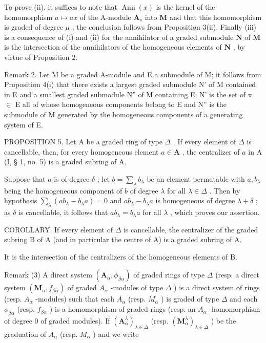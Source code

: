 To prove (ii), it suffices to note that \(\operatorname{Ann}(x)\) is the kernel of the homomorphism \(a \mapsto ax\) of the A-module \(\mathbf{A}_s\) into \(\mathbf{M}\) and that this homomorphism is graded of degree \(\mu\) ; the conclusion follows from Proposition 3(ii). Finally (iii) is a consequence of (i) and (ii) for the annihilator of a graded submodule \(\mathbf{N}\) of \(\mathbf{M}\) is the intersection of the annihilators of the homogeneous elements of \(\mathbf{N}\) , by virtue of Proposition 2.

Remark 2. Let M be a graded A-module and E a submodule of M; it follows from Proposition 4(i) that there exists a largest graded submodule N' of M contained in E and a smallest graded submodule N'' of M containing E; N' is the set of x \ensuremath{\in} E all of whose homogeneous components belong to E and N'' is the submodule of M generated by the homogeneous components of a generating system of E.

PROPOSITION 5. Let A be a graded ring of type \(\Delta\) . If every element of \(\Delta\) is cancellable, then, for every homogeneous element \(a \in \mathbf{A}\) , the centralizer of \(a\) in A (I, § 1, no. 5) is a graded subring of A.

Suppose that \(a\) is of degree \(\delta\) ; let \(b = \sum_{\lambda} b_{\lambda}\) be an element permutable with \(a, b_{\lambda}\) being the homogeneous component of \(b\) of degree \(\lambda\) for all \(\lambda \in \Delta\) . Then by hypothesis \(\sum_{\lambda} (ab_{\lambda} - b_{\lambda}a) = 0\) and \(ab_{\lambda} - b_{\lambda}a\) is homogeneous of degree \(\lambda + \delta\) ; as \(\delta\) is cancellable, it follows that \(ab_{\lambda} = b_{\lambda}a\) for all \(\lambda\) , which proves our assertion.

COROLLARY. If every element of \(\Delta\) is cancellable, the centralizer of the graded subring B of A (and in particular the centre of A) is a graded subring of A.

It is the intersection of the centralizers of the homogeneous elements of B.

Remark (3) A direct system \((\mathbf{A}_{\alpha}, \phi_{\beta\alpha})\) of graded rings of type \(\Delta\) (resp. a direct system \((\mathbf{M}_{\alpha}, f_{\beta\alpha})\) of graded \(A_{\alpha}\) -modules of type \(\Delta\) ) is a direct system of rings (resp. \(A_{\alpha}\) -modules) such that each \(A_{\alpha}\) (resp. \(M_{\alpha}\) ) is graded of type \(\Delta\) and each \(\phi_{\beta\alpha}\) (resp. \(f_{\beta\alpha}\) ) is a homomorphism of graded rings (resp. an \(A_{\alpha}\) -homomorphism of degree 0 of graded modules). If \((\mathbf{A}_{\alpha}^{\lambda})_{\lambda \in \Delta}\) (resp. \((\mathbf{M}_{\alpha}^{\lambda})_{\lambda \in \Delta}\) ) be the graduation of \(A_{\alpha}\) (resp. \(M_{\alpha}\) ) and we write


